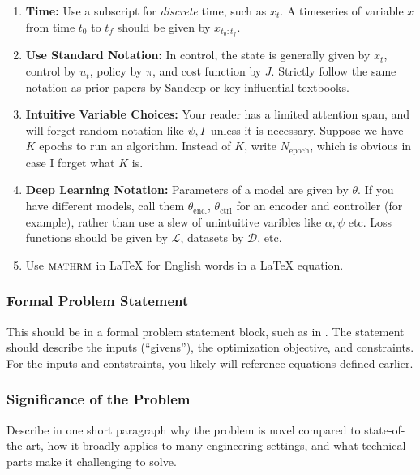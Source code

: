\begin{enumerate}
    \item \textbf{Time: } Use a subscript for \textit{discrete} time, such as $x_t$. A timeseries of variable $x$ from time $t_0$ to $t_f$ should be given by $x_{t_0:t_f}$.
    \item \textbf{Use Standard Notation: } In control, the state is generally given by $x_t$, control by $u_t$, policy by $\pi$, and cost function by $J$. Strictly follow the same notation as prior papers by Sandeep or key influential textbooks.
    \item \textbf{Intuitive Variable Choices: } Your reader has a limited attention span, and will forget random notation like $\psi, \Gamma$ unless it is necessary. Suppose we have $K$ epochs to run an algorithm. Instead of $K$, write $N_{\mathrm{epoch}}$, which is obvious in case I forget what $K$ is.
    \item \textbf{Deep Learning Notation: } Parameters of a model are given by $\theta$. If you have different models, call them $\theta_{\mathrm{enc.}}$, $\theta_{\mathrm{ctrl}}$ for an encoder and controller (for example), rather than use a slew of unintuitive varibles like $\alpha, \psi$ etc. Loss functions should be given by $\mathcal{L}$, datasets by $\mathcal{D}$, etc.
    \item Use $\textsc{mathrm}$ in LaTeX for English words in a LaTeX equation.
\end{enumerate}

\subsubsection{Formal Problem Statement}
This should be in a formal problem statement block, such as in \cite{}.
The statement should describe the inputs (``givens''), the optimization objective, and constraints. For the inputs and contstraints, you likely will reference equations defined earlier. 

\subsubsection{Significance of the Problem}
Describe in one short paragraph why the problem is novel compared to state-of-the-art, how it broadly applies to many engineering settings, and what technical parts make it challenging to solve.


